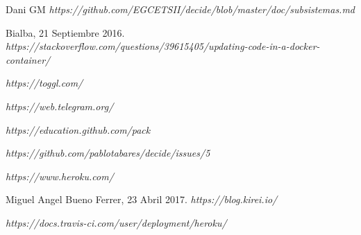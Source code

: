 \documentclass[12pt]{article}
\begin{document}
\begin{thebibliography}{9}
Dani GM
\textit
{https://github.com/EGCETSII/decide/blob/master/doc/subsistemas.md}

Bialba, 21 Septiembre 2016. 
\textit{https://stackoverflow.com/questions/39615405/updating-code-in-a-docker-container/}

\textit{https://toggl.com/}

\textit{https://web.telegram.org/}

\textit{https://education.github.com/pack}

\textit{https://github.com/pablotabares/decide/issues/5}

\textit{https://www.heroku.com/}

Miguel Angel Bueno Ferrer, 23 Abril 2017. 
\textit{https://blog.kirei.io/}

\textit{https://docs.travis-ci.com/user/deployment/heroku/}




\end{thebibliography}
\end{document}
